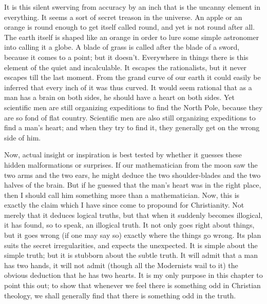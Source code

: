 It is this silent swerving from accuracy by an inch that is the uncanny element in everything. It seems a sort of secret treason in the universe. An apple or an orange is round enough to get itself called round, and yet is not round after all. The earth itself is shaped like an orange in order to lure some simple astronomer into calling it a globe. A blade of grass is called after the blade of a sword, because it comes to a point; but it doesn’t. Everywhere in things there is this element of the quiet and incalculable. It escapes the rationalists, but it never escapes till the last moment. From the grand curve of our earth it could easily be inferred that every inch of it was thus curved. It would seem rational that as a man has a brain on both sides, he should have a heart on both sides. Yet scientific men are still organizing expeditions to find the North Pole, because they are so fond of flat country. Scientific men are also still organizing expeditions to find a man’s heart; and when they try to find it, they generally get on the wrong side of him.

Now, actual insight or inspiration is best tested by whether it guesses these hidden malformations or surprises. If our mathematician from the moon saw the two arms and the two ears, he might deduce the two shoulder-blades and the two halves of the brain. But if he guessed that the man’s heart was in the right place, then I should call him something more than a mathematician. Now, this is exactly the claim which I have since come to propound for Christianity. Not merely that it deduces logical truths, but that when it suddenly becomes illogical, it has found, so to speak, an illogical truth. It not only goes right about things, but it goes wrong (if one may say so) exactly where the things go wrong. Its plan suits the secret irregularities, and expects the unexpected. It is simple about the simple truth; but it is stubborn about the subtle truth. It will admit that a man has two hands, it will not admit (though all the Modernists wail to it) the obvious deduction that he has two hearts. It is my only purpose in this chapter to point this out; to show that whenever we feel there is something odd in Christian theology, we shall generally find that there is something odd in the truth.

